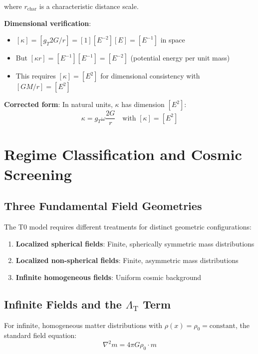 \documentclass[12pt,a4paper]{article}
\newcommand{\LambdaT}{\Lambda_{\text{T}}}
\newcommand{\kappaparam}{\kappa}
\begin{document}
	where $r_{\text{char}}$ is a characteristic distance scale.
	
	\textbf{Dimensional verification}:
	\begin{itemize}
		\item $[\kappaparam] = [g_T 2G/r] = [1][E^{-2}][E] = [E^{-1}]$ in space
		\item But $[\kappaparam r] = [E^{-1}][E^{-1}] = [E^{-2}]$ (potential energy per unit mass)
		\item This requires $[\kappaparam] = [E^2]$ for dimensional consistency with $[GM/r] = [E^2]$
	\end{itemize}
	
	\textbf{Corrected form}: In natural units, $\kappa$ has dimension $[E^2]$:
	\begin{equation}
		\kappaparam = g_T \omega \frac{2G}{r} \quad \text{with } [\kappaparam] = [E^2]
	\end{equation}
	
	\section{Regime Classification and Cosmic Screening}
	\label{sec:regime_classification}
	
	\subsection{Three Fundamental Field Geometries}
	\label{subsec:three_geometries}
	
	The T0 model requires different treatments for distinct geometric configurations:
	
	\begin{enumerate}
		\item \textbf{Localized spherical fields}: Finite, spherically symmetric mass distributions
		\item \textbf{Localized non-spherical fields}: Finite, asymmetric mass distributions  
		\item \textbf{Infinite homogeneous fields}: Uniform cosmic background
	\end{enumerate}
	
	\subsection{Infinite Fields and the $\LambdaT$ Term}
	\label{subsec:lambda_term}
	
	For infinite, homogeneous matter distributions with $\rho(x) = \rho_0 = \text{constant}$, the standard field equation:
	\begin{equation}
		\nabla^2 m = 4\pi G \rho_0 \cdot m
	\end{equation}
	
\end{document}
